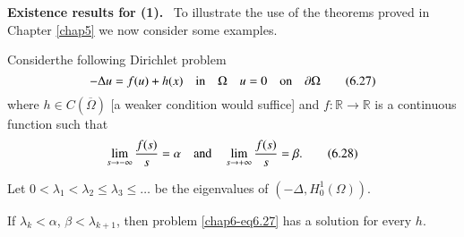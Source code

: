 \noindent
{\bf Existence results for (1).}~ To illustrate the use of the
theorems proved in Chapter \ref{chap5} we now consider some examples. 

\begin{example}\label{chap6-ex1}
Consider\pageoriginale the following Dirichlet problem
\begin{equation*}
-\Delta u=f(u)+h(x)\quad \text{in}\quad \Omega\quad u=0\quad \text{on}\quad \partial
\Omega\tag{6.27}\label{chap6-eq6.27} 
\end{equation*}
where $h\in C(\overline{\Omega})$ [a weaker condition would suffice]
and $f:\mathbb{R}\to \mathbb{R}$ is a continuous function such that
\begin{equation*}
\lim\limits_{s\to-\infty}\frac{f(s)}{s}=\alpha\quad \text{and}\quad
\lim\limits_{s\to
  +\infty}\frac{f(s)}{s}=\beta.\tag{6.28}\label{chap6-eq6.28} 
\end{equation*}

Let $0<\lambda_{1}<\lambda_{2}\leq \lambda_{3}\leq\ldots$ be the
eigenvalues of $(-\Delta,H^{1}_{0}(\Omega))$. 
\end{example}

\begin{theorem}\label{chap6-thm6.8}
If $\lambda_{k}<\alpha$, $\beta<\lambda_{k+1}$, then problem
\eqref{chap6-eq6.27} has a solution for every $h$.
\end{theorem}

